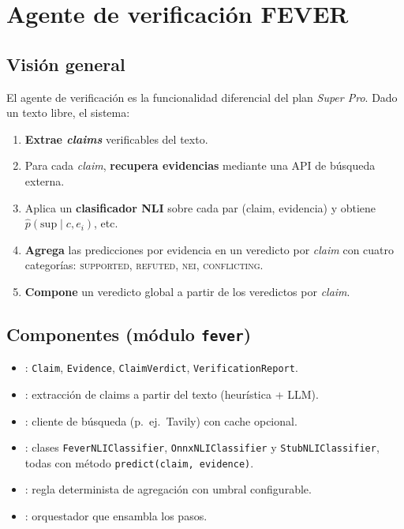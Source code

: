 \chapter{Agente de verificación FEVER}\label{cap:agente}

\section{Visión general}

El agente de verificación es la funcionalidad diferencial del plan
\emph{Super Pro}. Dado un texto libre, el sistema:

\begin{enumerate}[leftmargin=*,itemsep=0.2em]
  \item \textbf{Extrae \emph{claims}} verificables del texto.
  \item Para cada \emph{claim}, \textbf{recupera evidencias} mediante
        una API de búsqueda externa.
  \item Aplica un \textbf{clasificador NLI} sobre cada par
        (claim, evidencia) y obtiene
        $\hat{p}(\text{sup} \mid c, e_i)$, etc.
  \item \textbf{Agrega} las predicciones por evidencia en un
        veredicto por \emph{claim} con cuatro categorías:
        \textsc{supported}, \textsc{refuted}, \textsc{nei},
        \textsc{conflicting}.
  \item \textbf{Compone} un veredicto global a partir de los
        veredictos por \emph{claim}.
\end{enumerate}

\section{Componentes (módulo \texttt{fever})}

\begin{itemize}[leftmargin=*,itemsep=0.2em]
  \item {}: \texttt{Claim}, \texttt{Evidence},
        \texttt{ClaimVerdict}, \texttt{VerificationReport}.
  \item {}: extracción de claims a partir del
        texto (heurística + LLM).
  \item {}: cliente de búsqueda (p.\ ej.\ Tavily) con
        cache opcional.
  \item {}: clases \texttt{FeverNLIClassifier},
        \texttt{OnnxNLIClassifier} y \texttt{StubNLIClassifier}, todas
        con método \texttt{predict(claim, evidence)}.
  \item {}: regla determinista de agregación con
        umbral configurable.
  \item {}: orquestador que ensambla los pasos.
\end{itemize}


